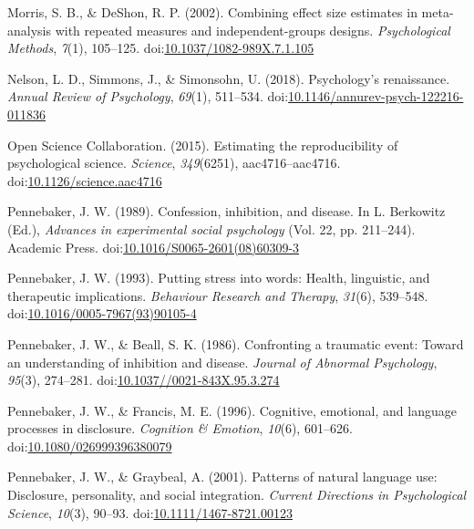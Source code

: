 \documentclass[english,man, mask]{apa6}
\theoremstyle{definition}
\theoremstyle{definition}
\theoremstyle{definition}
\theoremstyle{remark}
\begin{document}
\hypertarget{ref-Morris2002}{}
Morris, S. B., \& DeShon, R. P. (2002). Combining effect size estimates
in meta-analysis with repeated measures and independent-groups designs.
\emph{Psychological Methods}, \emph{7}(1), 105--125.
doi:\href{https://doi.org/10.1037/1082-989X.7.1.105}{10.1037/1082-989X.7.1.105}

\hypertarget{ref-Nelson2018}{}
Nelson, L. D., Simmons, J., \& Simonsohn, U. (2018). Psychology's
renaissance. \emph{Annual Review of Psychology}, \emph{69}(1), 511--534.
doi:\href{https://doi.org/10.1146/annurev-psych-122216-011836}{10.1146/annurev-psych-122216-011836}

\hypertarget{ref-OpenScienceCollaboration2015}{}
Open Science Collaboration. (2015). Estimating the reproducibility of
psychological science. \emph{Science}, \emph{349}(6251),
aac4716--aac4716.
doi:\href{https://doi.org/10.1126/science.aac4716}{10.1126/science.aac4716}

\hypertarget{ref-Pennebaker1989}{}
Pennebaker, J. W. (1989). Confession, inhibition, and disease. In L.
Berkowitz (Ed.), \emph{Advances in experimental social psychology} (Vol.
22, pp. 211--244). Academic Press.
doi:\href{https://doi.org/10.1016/S0065-2601(08)60309-3}{10.1016/S0065-2601(08)60309-3}

\hypertarget{ref-Pennebaker1993}{}
Pennebaker, J. W. (1993). Putting stress into words: Health, linguistic,
and therapeutic implications. \emph{Behaviour Research and Therapy},
\emph{31}(6), 539--548.
doi:\href{https://doi.org/10.1016/0005-7967(93)90105-4}{10.1016/0005-7967(93)90105-4}

\hypertarget{ref-Pennebaker1986}{}
Pennebaker, J. W., \& Beall, S. K. (1986). Confronting a traumatic
event: Toward an understanding of inhibition and disease. \emph{Journal
of Abnormal Psychology}, \emph{95}(3), 274--281.
doi:\href{https://doi.org/10.1037//0021-843X.95.3.274}{10.1037//0021-843X.95.3.274}

\hypertarget{ref-Pennebaker1996}{}
Pennebaker, J. W., \& Francis, M. E. (1996). Cognitive, emotional, and
language processes in disclosure. \emph{Cognition \& Emotion},
\emph{10}(6), 601--626.
doi:\href{https://doi.org/10.1080/026999396380079}{10.1080/026999396380079}

\hypertarget{ref-Pennebaker2001}{}
Pennebaker, J. W., \& Graybeal, A. (2001). Patterns of natural language
use: Disclosure, personality, and social integration. \emph{Current
Directions in Psychological Science}, \emph{10}(3), 90--93.
doi:\href{https://doi.org/10.1111/1467-8721.00123}{10.1111/1467-8721.00123}
\end{document}
